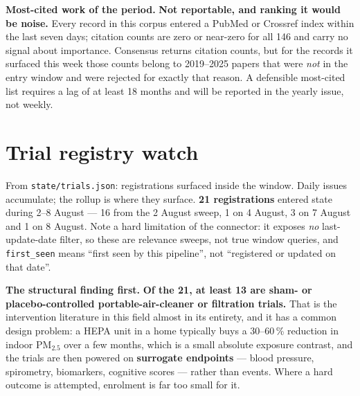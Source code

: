 \documentclass[10pt]{article}
\begin{document}
\vspace{2mm}
\textbf{Most-cited work of the period.} \textbf{Not reportable, and ranking it would be
noise.} Every record in this corpus entered a PubMed or Crossref index within the last
seven days; citation counts are zero or near-zero for all 146 and carry no signal about
importance. Consensus returns citation counts, but for the records it surfaced this week
those counts belong to 2019--2025 papers that were \emph{not} in the entry window and were
rejected for exactly that reason. A defensible most-cited list requires a lag of at least
18 months and will be reported in the yearly issue, not weekly.

\vspace{4mm}

\section*{\sffamily\bfseries\color{Deep}Trial registry watch}
\vspace{-1.5mm}{\color{Teal}\rule{\linewidth}{1.1pt}}\vspace{2.5mm}

{\fontsize{7.4}{9}\selectfont\color{Slate}From \texttt{state/trials.json}: registrations
surfaced inside the window. Daily issues accumulate; the rollup is where they surface.
\textbf{21 registrations} entered state during 2--8 August --- 16 from the 2 August sweep,
1 on 4 August, 3 on 7 August and 1 on 8 August. Note a hard limitation of the connector:
it exposes \emph{no} last-update-date filter, so these are relevance sweeps, not true
window queries, and \texttt{first\_seen} means ``first seen by this pipeline'', not
``registered or updated on that date''.\par}

\vspace{1.5mm}
\footnotesize
\textbf{The structural finding first.} \textbf{Of the 21, at least 13 are sham- or
placebo-controlled portable-air-cleaner or filtration trials.} That is the intervention
literature in this field almost in its entirety, and it has a common design problem:
a HEPA unit in a home typically buys a 30--60\,\% reduction in indoor PM$_{2.5}$ over a
few months, which is a small absolute exposure contrast, and the trials are then powered
on \textbf{surrogate endpoints} --- blood pressure, spirometry, biomarkers, cognitive
scores --- rather than events. Where a hard outcome is attempted, enrolment is far too
small for it.
\end{document}
